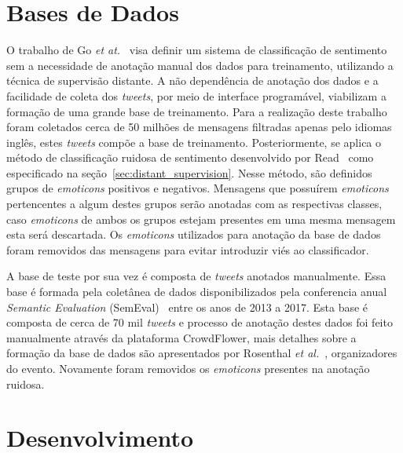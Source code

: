 \section{Bases de Dados}

O trabalho de Go \textit{et at.}~\cite{go09} visa definir um sistema de classificação de sentimento sem a necessidade de
anotação manual dos dados para treinamento, utilizando a técnica de supervisão distante.
A não dependência de anotação dos dados e a facilidade de coleta dos \textit{tweets}, por meio de interface programável,
viabilizam a formação de uma grande base de treinamento.
Para a realização deste trabalho foram coletados cerca de 50 milhões de mensagens filtradas apenas pelo idiomas inglês,
estes \textit{tweets} compõe a base de treinamento.
Posteriormente, se aplica o método de classificação ruidosa de sentimento desenvolvido por Read~\cite{read05} como
especificado na seção~\ref{sec:distant_supervision}.
Nesse método, são definidos grupos de \textit{emoticons} positivos e negativos.
Mensagens que possuírem \textit{emoticons} pertencentes a algum destes grupos serão anotadas com as respectivas classes,
caso \textit{emoticons} de ambos os grupos estejam presentes em uma mesma mensagem esta será descartada.
Os \textit{emoticons} utilizados para anotação da base de dados foram removidos das mensagens para evitar introduzir
viés ao classificador.

A base de teste por sua vez é composta de \textit{tweets} anotados manualmente.
Essa base é formada pela coletânea de dados disponibilizados pela conferencia anual \textit{Semantic Evaluation}
(SemEval)~\cite{semeval17} entre os anos de 2013 a 2017.
Esta base é composta de cerca de 70 mil \textit{tweets} e processo de anotação destes dados foi feito manualmente
através da plataforma CrowdFlower, mais detalhes sobre a formação da base de dados são apresentados por Rosenthal
\textit{et al.}~\cite{rosenthal17}, organizadores do evento.
Novamente foram removidos os \textit{emoticons} presentes na anotação ruidosa.

\section{Desenvolvimento}

